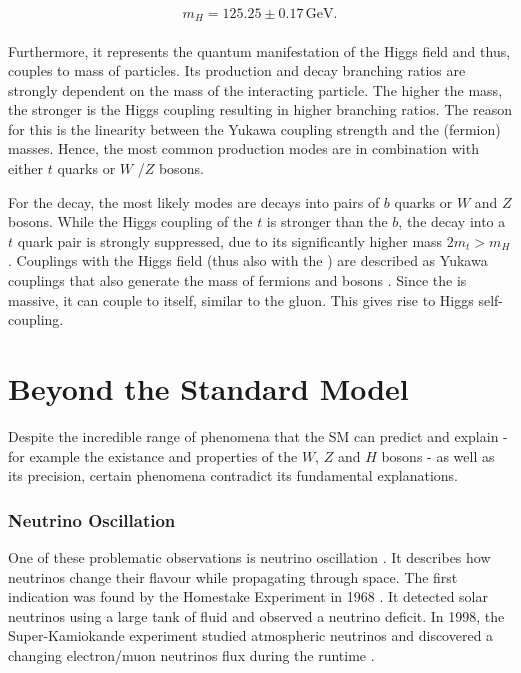 \documentclass[bachelor,ngerman,english]{GAUBM}
\begin{document}
\begin{gather}
    \begin{aligned}
        m_H=125.25\pm0.17\,\text{GeV}.
        \label{eq:mass_h}
    \end{aligned}
\end{gather}

Furthermore, it represents the quantum manifestation of the Higgs field and thus, couples to mass of particles. Its production and decay branching ratios are strongly dependent on the mass of the interacting particle. The higher the mass, the stronger is the Higgs coupling resulting in higher branching ratios. The reason for this is the linearity between the Yukawa coupling strength and the (fermion) masses. Hence, the most common production modes are in combination with either $t$ quarks or $W$ /$Z$ bosons. 

For the decay, the most likely modes are decays into pairs of $b$ quarks or $W$  and $Z$ bosons. While the Higgs coupling of the $t$ is stronger than the $b$, the decay into a $t$ quark pair is strongly suppressed, due to its significantly higher mass $2m_t>m_H$. Couplings with the Higgs field (thus also with the \Hboson) are described as Yukawa couplings that also generate the mass of fermions and bosons \cite{theory:higgs_mechanism_01,theory:higgs_mechanism_03}. Since the \Hboson is massive, it can couple to itself, similar to the gluon. This gives rise to Higgs self-coupling.   

\section{Beyond the Standard Model}
\label{sec:theory:bsm}
Despite the incredible range of phenomena that the SM can predict and explain - for example the existance and properties of the $W$, $Z$ and $H$ bosons - as well as its precision, certain phenomena contradict its fundamental explanations. 

\subsubsection*{Neutrino Oscillation}
One of these problematic observations is neutrino oscillation \cite{bsm_neutrino_oscillation_01,bsm_neutrino_oscillation_03}. It describes how neutrinos change their flavour while propagating through space. The first indication was found by the Homestake Experiment in 1968 \cite{bsm_neutrino_oscillation_04}. It detected solar neutrinos using a large tank of fluid and observed a neutrino deficit. In 1998, the Super-Kamiokande experiment studied atmospheric neutrinos and discovered a changing electron/muon neutrinos flux during the runtime \cite{bsm_neutrino_oscillation_02}. 
\end{document}
